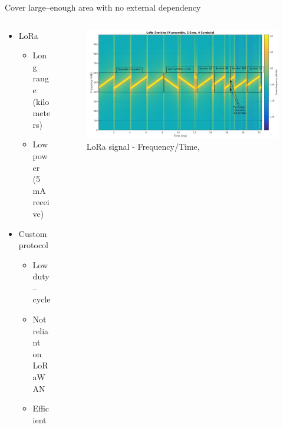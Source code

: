 \documentclass[hyphens]{beamer}
\begin{document}
\begin{frame}{Cover large--enough area with no external dependency}
\begin{columns}[T]
\begin{column}{.31\textwidth}
    \begin{itemize}
        \item LoRa
        \begin{itemize}
            \item Long range (kilometers)
            \item Low power (5~mA receive)
        \end{itemize}
        \item Custom protocol
        \begin{itemize}
            \item Low duty--cycle
            \item Not reliant on LoRaWAN
            \item Efficient
        \end{itemize}
    \end{itemize}
\end{column}
\hfil
\begin{column}{.69\textwidth}
    \begin{figure}
        \centering
        \includegraphics[width=\linewidth]{img/lora-signal.jpg}
        \caption*{LoRa signal - Frequency/Time, \cite{noauthor_what_nodate}}
    \end{figure}
\end{column}
\end{columns}
\end{frame}
\end{document}
